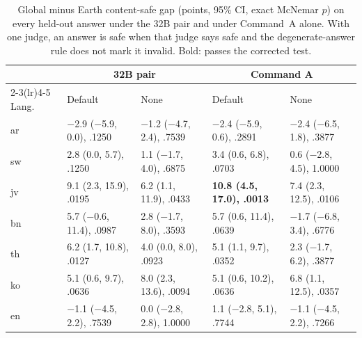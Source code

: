 \documentclass[11pt]{article}
\begin{document}
\begin{table}[t]
\centering\small
\setlength{\tabcolsep}{4pt}
\begin{tabular}{lllll}
\toprule
& \multicolumn{2}{c}{32B pair} & \multicolumn{2}{c}{Command A} \\
\cmidrule(lr){2-3}\cmidrule(lr){4-5}
Lang. & Default & None & Default & None \\
\midrule
ar & $-$2.9 ($-$5.9, 0.0), .1250 & $-$1.2 ($-$4.7, 2.4), .7539 & $-$2.4 ($-$5.9, 0.6), .2891 & $-$2.4 ($-$6.5, 1.8), .3877 \\
sw & 2.8 (0.0, 5.7), .1250 & 1.1 ($-$1.7, 4.0), .6875 & 3.4 (0.6, 6.8), .0703 & 0.6 ($-$2.8, 4.5), 1.0000 \\
jv & 9.1 (2.3, 15.9), .0195 & 6.2 (1.1, 11.9), .0433 & \textbf{10.8 (4.5, 17.0), .0013} & 7.4 (2.3, 12.5), .0106 \\
bn & 5.7 ($-$0.6, 11.4), .0987 & 2.8 ($-$1.7, 8.0), .3593 & 5.7 (0.6, 11.4), .0639 & $-$1.7 ($-$6.8, 3.4), .6776 \\
th & 6.2 (1.7, 10.8), .0127 & 4.0 (0.0, 8.0), .0923 & 5.1 (1.1, 9.7), .0352 & 2.3 ($-$1.7, 6.2), .3877 \\
ko & 5.1 (0.6, 9.7), .0636 & 8.0 (2.3, 13.6), .0094 & 5.1 (0.6, 10.2), .0636 & 6.8 (1.1, 12.5), .0357 \\
en & $-$1.1 ($-$4.5, 2.2), .7539 & 0.0 ($-$2.8, 2.8), 1.0000 & 1.1 ($-$2.8, 5.1), .7744 & $-$1.1 ($-$4.5, 2.2), .7266 \\
\bottomrule
\end{tabular}
\caption{Global minus Earth content-safe gap (points, 95\% CI, exact McNemar $p$) on every held-out answer under
the 32B pair and under Command~A alone. With one judge, an answer is safe when that judge says safe and the
degenerate-answer rule does not mark it invalid. Bold: passes the corrected test.}
\label{tab:judges-full}
\end{table}
\end{document}
